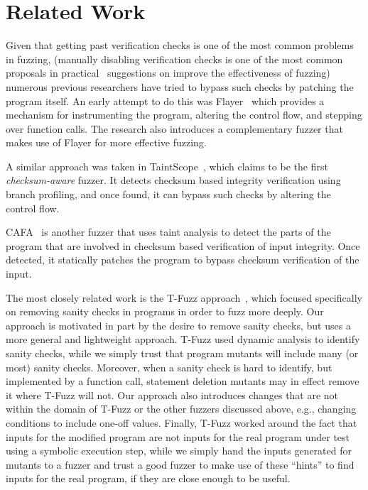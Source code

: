 \section{Related Work}

Given that getting past verification checks is one of the most common problems in fuzzing,
(manually disabling verification checks is one of the most common proposals in practical~\cite{chromeadvice}
suggestions on improve the effectiveness of fuzzing)
numerous previous researchers have tried to bypass such checks by
patching the program itself.
An early attempt to do this was Flayer~\cite{drewry2O07flayer} which
provides a mechanism for instrumenting the program, altering the control flow,
and stepping over function calls. The research also introduces a complementary
fuzzer that makes use of Flayer for more effective fuzzing.

A similar approach was taken in TaintScope~\cite{wang2010taintscope}, which claims to be the first \emph{checksum-aware} fuzzer. It detects checksum
based integrity verification using branch profiling, and once found, it can
bypass such checks by altering the control flow.

CAFA~\cite{liu2018cafa} is another fuzzer that uses taint analysis to detect the
parts of the program that are involved in checksum based verification of
input integrity. Once detected, it statically patches the program to bypass
checksum verification of the input.

The most closely related work is the T-Fuzz approach~\cite{tfuzz}, which focused specifically on removing sanity checks in programs in order to fuzz more deeply.  Our approach is motivated in part by the desire to remove sanity checks, but uses a more general and lightweight approach.  T-Fuzz used dynamic analysis to identify sanity checks, while we simply trust that program mutants will include many (or most) sanity checks.  Moreover, when a sanity check is hard to identify, but implemented by a function call, statement deletion mutants may in effect remove it where T-Fuzz will not.  Our approach also introduces changes that are not within the domain of T-Fuzz or the other fuzzers discussed above, e.g., changing conditions to include one-off values.  Finally, T-Fuzz worked around the fact that inputs for the modified program are not inputs for the real program under test using a symbolic execution step, while we simply hand the inputs generated for mutants to a fuzzer and trust a good fuzzer to make use of these ``hints'' to find inputs for the real program, if they are close enough to be useful.

